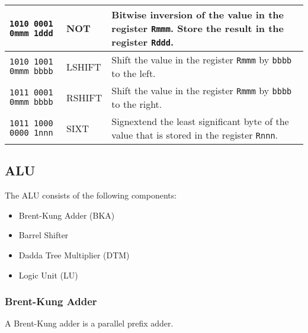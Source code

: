 \documentclass[twoside]{article}
\begin{document}
\begin{table}[H]
\begin{longtable}{m{}m{}m{}}
                                                    \hline
                                                    \bigstrut
        \texttt{1010 0001 0mmm 1ddd} & NOT       & Bitwise inversion of the value in
                                                    the register \texttt{Rmmm}. Store
                                                    the result in the register
                                                    \texttt{Rddd}.\\
                                                    \hline
                                                    \bigstrut
        \texttt{1010 1001 0mmm bbbb} & LSHIFT    & Shift the value in the register
                                                    \texttt{Rmmm} by \texttt{bbbb} to
                                                    the left.\\
                                                    \hline
                                                    \bigstrut
        \texttt{1011 0001 0mmm bbbb} & RSHIFT    & Shift the value in the register
                                                    \texttt{Rmmm} by \texttt{bbbb} to
                                                    the right.\\
                                                    \hline
                                                    \bigstrut
        \texttt{1011 1000 0000 1nnn} & SIXT      & Signextend the least significant
                                                    byte of the value that is stored
                                                    in the register \texttt{Rnnn}.\\
                                                    \hline
    \end{longtable}
\end{table}

\subsection*{ALU}
The ALU consists of the following components:
\begin{itemize}
    \item Brent-Kung Adder (BKA)
    \item Barrel Shifter
    \item Dadda Tree Multiplier (DTM)
    \item Logic Unit (LU)
\end{itemize}

\subsubsection*{Brent-Kung Adder}
A Brent-Kung adder is a parallel prefix adder.\cite{brent82}
\end{document}
